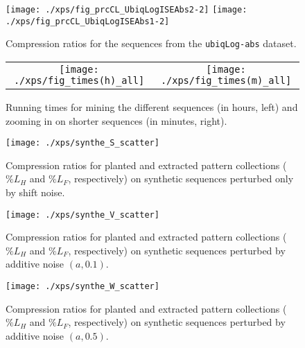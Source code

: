 \documentclass{report}
\newcommand{\dstname}[1]{\texttt{#1}}
\newcommand{\dstUbiAR}[1]{\dstname{ubiqLog-{#1}}}
\newcommand{\iAbs}{abs}
\newcommand{\cl}{\mathit{L}}
\newcommand{\prcCl}{\%\cl}
\begin{document}





\begin{figure}[tbp]
\centering
\caption{Compression ratios for the sequences from the \dstUbiAR{\iAbs} dataset.}
\label{fig:xps-prcCl-ubi-abs}
\texttt{[image: ./xps/fig\_prcCL\_UbiqLogISEAbs2-2]}
\texttt{[image: ./xps/fig\_prcCL\_UbiqLogISEAbs1-2]}
\end{figure}



\begin{figure}[tbp]
  \centering
  \begin{tabular}{@{}cc@{}}
    \texttt{[image: ./xps/fig\_times(h)\_all]} &
    \texttt{[image: ./xps/fig\_times(m)\_all]} \\
  \end{tabular}
\caption{Running times for mining the different sequences (in hours, left) and zooming in on shorter sequences (in minutes, right).}
\label{fig:xps-times}
\end{figure}


\FloatBarrier
\begin{figure}[tbp] \centering
\caption{Compression ratios for planted and extracted pattern collections ($\prcCl_H$ and $\prcCl_F$, respectively) on synthetic sequences perturbed only by shift noise.}
\label{fig:synthe_1_cr}
\texttt{[image: ./xps/synthe\_S\_scatter]}
\end{figure}

\begin{figure}[tbp] \centering
\caption{Compression ratios for planted and extracted pattern collections ($\prcCl_H$ and $\prcCl_F$, respectively) on synthetic sequences perturbed by additive noise $(a, 0.1)$.}
\label{fig:synthe_2_cr}
\texttt{[image: ./xps/synthe\_V\_scatter]}
\end{figure}

\begin{figure}[tbp] \centering
\caption{Compression ratios for planted and extracted pattern collections ($\prcCl_H$ and $\prcCl_F$, respectively) on synthetic sequences perturbed by additive noise $(a, 0.5)$.}
\label{fig:synthe_3_cr}
\texttt{[image: ./xps/synthe\_W\_scatter]}
\end{figure}
\end{document}
